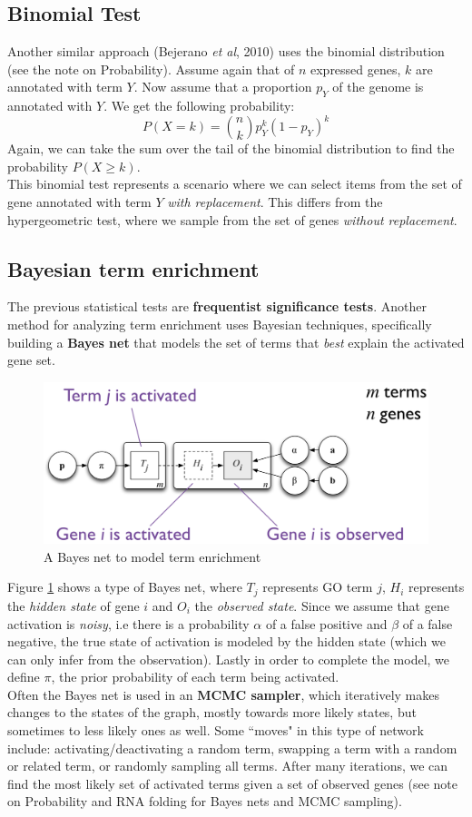 \documentclass[12pt]{article}
\begin{document}
\subsection{Binomial Test}
Another similar approach (Bejerano \textit{et al}, 2010) uses the binomial distribution (see the note on Probability). Assume again that of $n$ expressed genes, $k$ are annotated with term $Y$. Now assume that a proportion $p_Y$ of the genome is annotated with $Y$. We get the following probability:
$$P(X = k) = \binom{n}{k}p_Y^k(1 - p_Y)^k$$
Again, we can take the sum over the tail of the binomial distribution to find the probability $P(X\geq k)$.\\[10pt]
This binomial test represents a scenario where we can select items from the set of gene annotated with term $Y$ \textit{with replacement}. This differs from the hypergeometric test, where we sample from the set of genes \textit{without replacement}.

\subsection{Bayesian term enrichment}
The previous statistical tests are \textbf{frequentist significance tests}. Another method for analyzing term enrichment uses Bayesian techniques, specifically building a \textbf{Bayes net} that models the set of terms that \textit{best} explain the activated gene set.
\begin{figure}[h]
    \centering
    \includegraphics[width=.8\linewidth]{bayes.png}
    \caption{A Bayes net to model term enrichment}
    \label{fig:bayes}
\end{figure}

Figure \ref{fig:bayes} shows a type of Bayes net, where $T_j$ represents GO term $j$, $H_i$ represents the \textit{hidden state} of gene $i$ and $O_i$ the \textit{observed state}. Since we assume that gene activation is \textit{noisy}, i.e there is a probability $\alpha$ of a false positive and $\beta$ of a false negative, the true state of activation is modeled by the hidden state (which we can only infer from the observation). Lastly in order to complete the model, we define $\pi$, the prior probability of each term being activated.\\[10pt]
Often the Bayes net is used in an \textbf{MCMC sampler}, which iteratively makes changes to the states of the graph, mostly towards more likely states, but sometimes to less likely ones as well. Some ``moves" in this type of network include: activating/deactivating a random term, swapping a term with a random or related term, or randomly sampling all terms. After many iterations, we can find the most likely set of activated terms given a set of observed genes (see note on Probability and RNA folding for Bayes nets and MCMC sampling).
\end{document}
